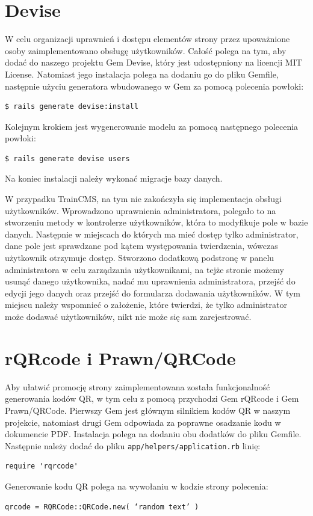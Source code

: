 \documentclass[openright]{xmgr}
\begin{document}
\newpage

\section{Devise}
W celu organizacji uprawnień i dostępu elementów strony przez upoważnione osoby zaimplementowano obsługę użytkowników. Całość polega na tym, aby dodać do naszego projektu Gem Devise\cite{devise}, który jest udostępniony na licencji MIT License. Natomiast jego instalacja polega na dodaniu go do pliku Gemfile, następnie użyciu generatora wbudowanego w Gem za pomocą polecenia powłoki: 
\begin{lstlisting}[language=bashes, caption={Polecenie instalujące Gem Devise w naszym projekcie}]
$ rails generate devise:install
\end{lstlisting}
Kolejnym krokiem jest wygenerowanie modelu za pomocą następnego polecenia powłoki: 
\begin{lstlisting}[language=bashes, caption={Polecenie generujące modeul użytkowników w naszym projekcie}]
$ rails generate devise users
\end{lstlisting}
Na koniec instalacji należy wykonać migracje bazy danych.

W przypadku TrainCMS, na tym nie zakończyła się implementacja obsługi użytkowników. Wprowadzono uprawnienia administratora, polegało to na stworzeniu metody w kontrolerze użytkowników, która to modyfikuje pole w bazie danych. Następnie w miejscach do których ma mieć dostęp tylko administrator, dane pole jest sprawdzane pod kątem występowania twierdzenia, wówczas użytkownik otrzymuje dostęp. Stworzono dodatkową podstronę w panelu administratora w celu zarządzania użytkownikami, na tejże stronie możemy usunąć danego użytkownika, nadać mu uprawnienia administratora, przejść do edycji jego danych oraz przejść do formularza dodawania użytkowników. W tym miejscu należy wspomnieć o założenie, które twierdzi, że tylko administrator może dodawać użytkowników, nikt nie może się sam zarejestrować.

\newpage

\section{rQRcode i Prawn/QRCode}
Aby ułatwić promocję strony zaimplementowana została funkcjonalność generowania kodów QR, w tym celu z pomocą przychodzi Gem rQRcode\cite{rqrcode} i Gem Prawn/QRCode\cite{prawnqr}. Pierwszy Gem jest głównym silnikiem kodów QR w naszym projekcie, natomiast drugi Gem odpowiada za poprawne osadzanie kodu w dokumencie PDF. Instalacja polega na dodaniu obu dodatków do pliku Gemfile. Następnie należy dodać do pliku  \texttt{app/helpers/application.rb} linię:
\begin{lstlisting}[language=ruby2, caption={Kod generujący kod QR}]
require 'rqrcode'
\end{lstlisting}
Generowanie kodu QR polega na wywołaniu w kodzie strony polecenia:
\begin{lstlisting}[language=ruby2, caption={Kod generujący kod QR}]
qrcode = RQRCode::QRCode.new( ‘random text’ )
\end{lstlisting}
\end{document}
